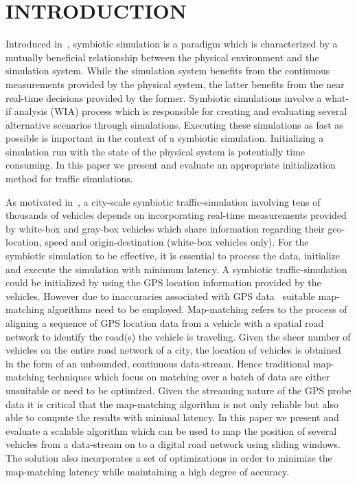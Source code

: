 \documentclass{wscpaperproc}
\theoremstyle{wsc}
\begin{document}
\section{INTRODUCTION}
\label{sec:introduction}
Introduced in~, symbiotic simulation is a paradigm which is characterized by a mutually beneficial relationship between the physical environment and the simulation system. While the simulation system benefits from the continuous measurements provided by the physical system, the latter benefits from the near real-time decisions provided by the former. Symbiotic simulations involve a what-if analysis (WIA) process which is responsible for creating and evaluating several alternative scenarios through simulations. Executing these simulations as fast as possible is important in the context of a symbiotic simulation. Initializing a simulation run with the state of the physical system is potentially time consuming. In this paper we present and evaluate an appropriate initialization method for traffic simulations.

As motivated in~\cite{aydt2012symbiotic}, a city-scale symbiotic traffic-simulation involving tens of thousands of vehicles depends on incorporating real-time measurements provided by white-box and gray-box vehicles which share information regarding their geo-location, speed and origin-destination (white-box vehicles only). For the symbiotic simulation to be effective, it is essential to process the data, initialize and execute the simulation with minimum latency. A symbiotic traffic-simulation could be initialized by using the GPS location information provided by the vehicles. However due to inaccuracies associated with GPS data~ suitable  map-matching algorithms need to be employed. Map-matching refers to the process of aligning a sequence of GPS location data from a vehicle with a spatial road network to identify the road(s) the vehicle is traveling. Given the sheer number of vehicles on the entire road network of a city, the location of vehicles is obtained in the form of an unbounded, continuous data-stream. Hence traditional map-matching techniques which focus on matching over a batch of data are either unsuitable or need to be optimized. Given the streaming nature of the GPS probe data it is critical that the map-matching algorithm is not only reliable but also able to compute the results with minimal latency. In this paper we present and evaluate a scalable algorithm which can be used to map the position of several vehicles from a data-stream on to a digital road network using sliding windows. The solution also incorporates a set of optimizations in order to minimize the map-matching latency while maintaining a high degree of accuracy.
\end{document}
